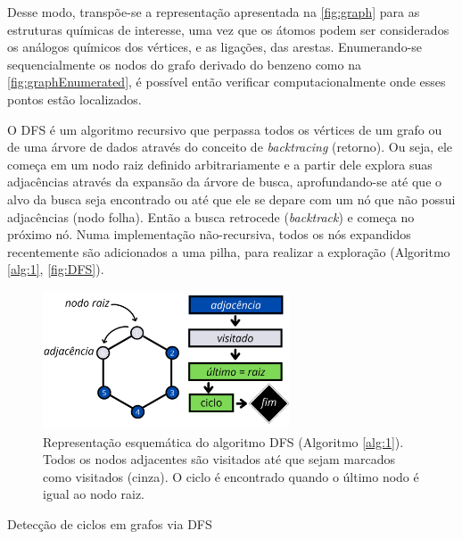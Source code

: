 Desse modo, transpõe-se a representação apresentada na \autoref{fig:graph} para as estruturas químicas de interesse, uma vez que os átomos podem ser considerados os análogos químicos dos vértices, e as ligações, das arestas. Enumerando-se sequencialmente os nodos do grafo derivado do benzeno como na \autoref{fig:graphEnumerated}, é possível então verificar computacionalmente onde esses pontos estão localizados.

O \gls{DFS}\autocite{Knuth1997-jf, Goodrich2001-pd} é um algoritmo recursivo que perpassa todos os vértices de um grafo ou de uma árvore de dados através do conceito de \textit{backtracing} (retorno). Ou seja, ele começa em um nodo raiz definido arbitrariamente e a partir dele explora suas adjacências através da expansão da árvore de busca, aprofundando-se até que o alvo da busca seja encontrado ou até que ele se depare com um nó que não possui adjacências (nodo folha). Então a busca retrocede (\textit{backtrack}) e começa no próximo nó. Numa implementação não-recursiva, todos os nós expandidos recentemente são adicionados a uma pilha, para realizar a exploração (Algoritmo \ref{alg:1}, \autoref{fig:DFS}).

\begin{figure}[htb]
\caption{\label{fig:DFS} Representação esquemática do algoritmo DFS (Algoritmo \ref{alg:1}). Todos os nodos adjacentes são visitados até que sejam marcados como visitados (cinza). O ciclo é encontrado quando o último nodo é igual ao nodo raiz.}
	\begin{center}
		\includegraphics[width=0.65\textwidth]{images/DFS.png}
	\end{center}
\end{figure}


\begin{algorithm}
\caption{Detecção de ciclos em grafos via DFS}\label{alg:1}
\LinesNumbered
{}

\end{algorithm}

